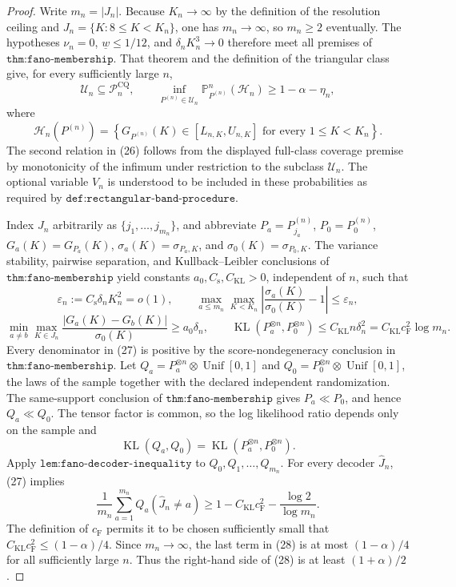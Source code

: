 \documentclass{article}
\begin{document}
\begin{proof}
Write \(m_n=|J_n|\).  Because \(K_n\to\infty\) by the definition of the resolution ceiling and \(J_n=\{K:8\leq K<K_n\}\), one has \(m_n\to\infty\), so \(m_n\geq2\) eventually.  The hypotheses \(\nu_n=0\), \(\underline w\leq1/12\), and \(\delta_nK_n^3\to0\) therefore meet all premises of \(\texttt{thm:fano-membership}\).  That theorem and the definition of the triangular class give, for every sufficiently large \(n\),
\[
 \mathcal U_n\subseteq\mathcal P_n^{\mathrm{CQ}},
 \qquad
 \inf_{P^{(n)}\in\mathcal U_n}\mathbb P_{P^{(n)}}^n(\mathcal H_n)
 \geq1-\alpha-\eta_n,                                      \tag{26}
\]
where
\[
 \mathcal H_n(P^{(n)})=
 \left\{G_{P^{(n)}}(K)\in[L_{n,K},U_{n,K}]
 \text{ for every }1\leq K<K_n\right\}.
\]
The second relation in (26) follows from the displayed full-class coverage premise by monotonicity of the infimum under restriction to the subclass \(\mathcal U_n\).  The optional variable \(V_n\) is understood to be included in these probabilities as required by \(\texttt{def:rectangular-band-procedure}\).

Index \(J_n\) arbitrarily as \(\{j_1,\ldots,j_{m_n}\}\), and abbreviate \(P_a=P_{j_a}^{(n)}\), \(P_0=P_0^{(n)}\), \(G_a(K)=G_{P_a}(K)\), \(\sigma_a(K)=\sigma_{P_a,K}\), and \(\sigma_0(K)=\sigma_{P_0,K}\).  The variance stability, pairwise separation, and Kullback--Leibler conclusions of \(\texttt{thm:fano-membership}\) yield constants \(a_0,C_{\mathrm s},C_{\mathrm{KL}}>0\), independent of \(n\), such that
\[
 \varepsilon_n:=C_{\mathrm s}\delta_nK_n^2=o(1),\qquad
 \max_{a\leq m_n}\max_{K<K_n}
 \left|\frac{\sigma_a(K)}{\sigma_0(K)}-1\right|\leq\varepsilon_n,
\]
\[
 \min_{a\neq b}\max_{K\in J_n}
 \frac{|G_a(K)-G_b(K)|}{\sigma_0(K)}\geq a_0\delta_n,
 \qquad
 \operatorname{KL}(P_a^{\otimes n},P_0^{\otimes n})
 \leq C_{\mathrm{KL}}n\delta_n^2
 =C_{\mathrm{KL}}c_{\mathrm F}^2\log m_n.                    \tag{27}
\]
Every denominator in (27) is positive by the score-nondegeneracy conclusion in \(\texttt{thm:fano-membership}\).  Let \(Q_a=P_a^{\otimes n}\otimes\operatorname{Unif}[0,1]\) and \(Q_0=P_0^{\otimes n}\otimes\operatorname{Unif}[0,1]\), the laws of the sample together with the declared independent randomization.  The same-support conclusion of \(\texttt{thm:fano-membership}\) gives \(P_a\ll P_0\), and hence \(Q_a\ll Q_0\).  The tensor factor is common, so the log likelihood ratio depends only on the sample and
\[
 \operatorname{KL}(Q_a,Q_0)=\operatorname{KL}(P_a^{\otimes n},P_0^{\otimes n}).
\]
Apply \(\texttt{lem:fano-decoder-inequality}\) to \(Q_0,Q_1,\ldots,Q_{m_n}\).  For every decoder \(\widehat J_n\), (27) implies
\[
 \frac1{m_n}\sum_{a=1}^{m_n}Q_a(\widehat J_n\neq a)
 \geq1-C_{\mathrm{KL}}c_{\mathrm F}^2-\frac{\log2}{\log m_n}. \tag{28}
\]
The definition of \(c_{\mathrm F}\) permits it to be chosen sufficiently small that \(C_{\mathrm{KL}}c_{\mathrm F}^2\leq(1-\alpha)/4\).  Since \(m_n\to\infty\), the last term in (28) is at most \((1-\alpha)/4\) for all sufficiently large \(n\).  Thus the right-hand side of (28) is at least \((1+\alpha)/2\).


\end{proof}
\end{document}
